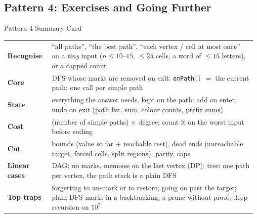 \subsection{Pattern 4: Exercises and Going Further}
\label{ssec:ch2-p4-ex}

\begin{patternbox}{Pattern 4 Summary Card}
\renewcommand{\arraystretch}{1.25}
\begin{tabularx}{\linewidth}{@{}>{\bfseries}l X@{}}
Recognise & ``all paths'', ``the best path'', ``each vertex / cell at most once'' on a \emph{tiny} input ($n \le 10$--$15$, $\le 25$ cells, a word of $\le 15$ letters), or a capped count \\
Core & DFS whose marks are removed on exit: \texttt{onPath[]} $=$ the current path; one call per simple path \\
State & everything the answer needs, kept on the path: add on enter, undo on exit (path list, sum, colour counts, prefix sums) \\
Cost & (number of simple paths) $\times$ degree; count it on the worst input before coding \\
Cut & bounds (value so far $+$ reachable rest), dead ends (unreachable target, forced cells, split regions), parity, caps \\
Linear cases & DAG: no marks, memoise on the last vertex (DP); tree: one path per vertex, the path stack is a plain DFS \\
Top traps & forgetting to un-mark or to restore; going on past the target; plain DFS marks in a backtracking; a prune without proof; deep recursion on $10^5$ \\
\end{tabularx}
\end{patternbox}

